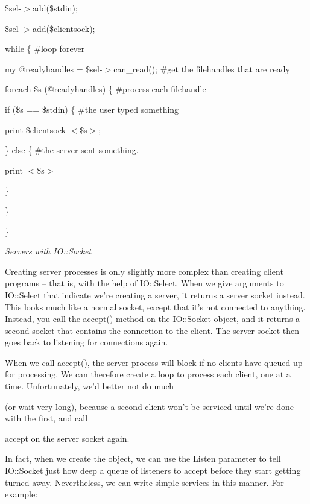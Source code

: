 \documentclass[a4paper,11pt]{book}
\begin{document}
\noindent \$sel-$>$add(\$stdin);

\noindent \$sel-$>$add(\$clientsock);

\noindent 

\noindent while \{ \#loop forever

\noindent my @readyhandles = \$sel-$>$can\_read(); \#get the filehandles that are ready

\noindent foreach \$s (@readyhandles) \{ \#process each filehandle

\noindent if (\$s == \$stdin) \{ \#the user typed something

\noindent print \$clientsock $<$\$s$>$;

\noindent \} else \{ \#the server sent something.

\noindent print $<$\$s$>$

\noindent \}

\noindent \}

\noindent \}

\noindent 

\noindent \textit{Servers with IO::Socket}

\noindent Creating server processes is only slightly more complex than creating client programs -- that is, with the help of IO::Select. When we give arguments to IO::Select that indicate we're creating a server, it returns a server socket instead. This looks much like a normal socket, except that it's not connected to anything. Instead, you call the accept() method on the IO::Socket object, and it returns a second socket that contains the connection to the client. The server socket then goes back to listening for connections again.

\noindent 

\noindent When we call accept(), the server process will block if no clients have queued up for processing. We can therefore create a loop to process each client, one at a time. Unfortunately, we'd better not do much

\noindent (or wait very long), because a second client won't be serviced until we're done with the first, and call

\noindent accept on the server socket again.

\noindent 

\noindent In fact, when we create the object, we can use the Listen parameter to tell IO::Socket just how deep a queue of listeners to accept before they start getting turned away. Nevertheless, we can write simple services in this manner. For example:
\end{document}
